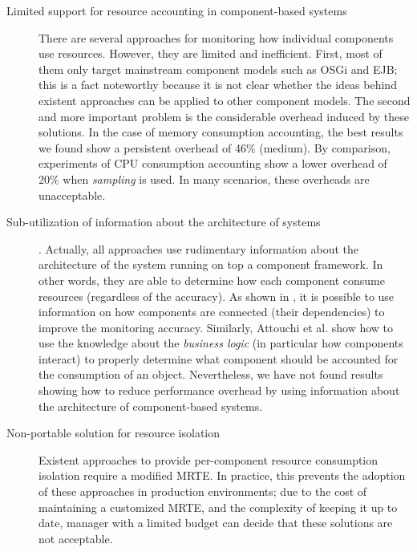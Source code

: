 \begin{description}

\item[Limited support for resource accounting in component-based systems] There are several approaches for monitoring how individual components use resources.
However, they are limited and inefficient.
First, most of them only target mainstream component models such as OSGi and EJB; this is a fact noteworthy because it is not clear whether the ideas behind existent approaches can be applied to other component models.
The second and more important problem is the considerable overhead induced by these solutions.
In the case of memory consumption accounting, the best results we found show a persistent overhead of 46\% (medium).
By comparison, experiments of CPU consumption accounting show a lower overhead of 20\% when \textit{sampling} is used.
In many scenarios, these overheads are unacceptable. 

\item[Sub-utilization of information about the architecture of systems].
Actually, all approaches use rudimentary information about the architecture of the system running on top a component framework.
In other words, they are able to determine how each component consume resources (regardless of the accuracy).
As shown in \cite{Maurel:2012:AME:2304736.2304763}, it is possible to use information on how components are connected (their dependencies) to improve the monitoring accuracy.
Similarly, Attouchi et al. \cite{Attouchi:2014:MMM:2602458.2602467} show how to use the knowledge about the \textit{business logic} (in particular how components interact) to properly determine what component should be accounted for the consumption of an object.
Nevertheless, we have not found results showing how to reduce performance overhead by using information about the architecture of component-based systems. 


\item[Non-portable solution for resource isolation] Existent approaches to provide per-component resource consumption isolation require a modified MRTE.
In practice, this prevents the adoption of these approaches in production environments; due to the cost of maintaining a customized MRTE, and the complexity of keeping it up to date, manager  with a limited budget can decide that these solutions are not acceptable.



\end{description}
